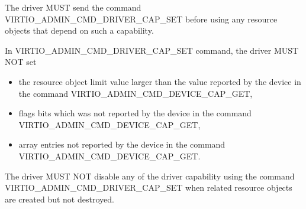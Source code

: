 
The driver MUST send the command VIRTIO_ADMIN_CMD_DRIVER_CAP_SET before
using any resource objects that depend on such a capability.

In VIRTIO_ADMIN_CMD_DRIVER_CAP_SET command, the driver MUST NOT set
\begin{itemize}
\item the resource object limit value larger than the value reported
by the device in the command VIRTIO_ADMIN_CMD_DEVICE_CAP_GET,
\item flags bits which was not reported by the device in the command
VIRTIO_ADMIN_CMD_DEVICE_CAP_GET,
\item array entries not reported by the device in the command
VIRTIO_ADMIN_CMD_DEVICE_CAP_GET.
\end{itemize}

The driver MUST NOT disable any of the driver capability using the command
VIRTIO_ADMIN_CMD_DRIVER_CAP_SET when related resource objects
are created but not destroyed.
